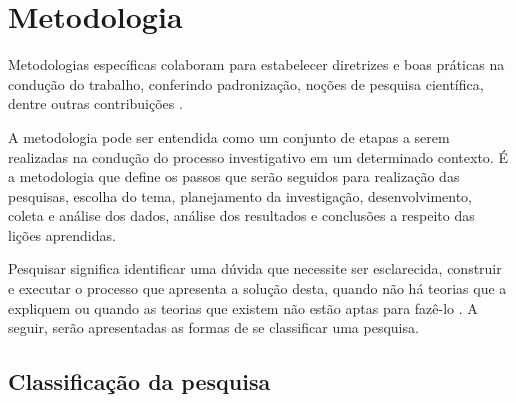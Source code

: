 \chapter{Metodologia}
\label{chapter:Metodologia}

Metodologias específicas colaboram para estabelecer diretrizes e boas práticas na condução do trabalho, conferindo padronização, noções de pesquisa científica, dentre outras contribuições \cite{Wohlin:2000}.

A metodologia pode ser entendida como um conjunto de etapas a serem realizadas na condução do processo investigativo em um determinado contexto. É a metodologia que define os passos que serão seguidos para realização das pesquisas, escolha do tema, planejamento da investigação, desenvolvimento, coleta e análise dos dados, análise dos resultados e conclusões a respeito das lições aprendidas\cite{Moresi:2003}.

Pesquisar significa identificar uma dúvida que necessite ser esclarecida, construir e executar o processo que apresenta a solução desta, quando não há teorias que a expliquem ou quando as teorias que existem não estão aptas para fazê-lo \cite{Koche:1997}. A seguir, serão apresentadas as formas de se classificar uma pesquisa.

\section{Classificação da pesquisa}

